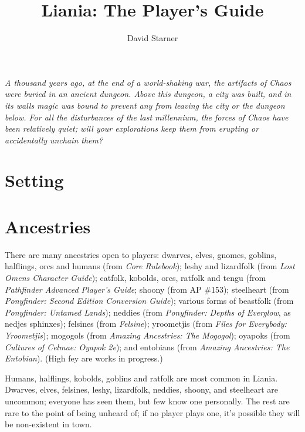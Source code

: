 \documentclass{report}
\title{Liania: The Player's Guide}
\author{David Starner}
\begin{document}
\maketitle
\emph{A thousand years ago, at the end of a world-shaking war, the artifacts of
Chaos were buried in an ancient dungeon. Above this dungeon, a city was built,
and in its walls magic was bound to prevent any from leaving the city or the
dungeon below. For all the disturbances of the last millennium, the forces
of Chaos have been relatively quiet; will your explorations keep them from
erupting or accidentally unchain them?}

\chapter{Setting}


\chapter{Ancestries}

There are many ancestries open to players: dwarves, elves, gnomes, goblins,
halflings, orcs and humans (from \emph{Core Rulebook}); leshy and lizard\-folk (from
\emph{Lost Omens Character Guide}); catfolk, kobolds, orcs, ratfolk and tengu (from
\emph{Pathfinder Advanced Player's Guide}; shoony (from AP \#153);
steel\-heart (from \emph{Pony\-finder: Second Edition Conversion Guide}); various forms
of beast\-folk (from \emph{Pony\-finder: Untamed Lands}); neddies (from \emph{Pony\-finder:
Depths of Everglow}, as nedjes sphinxes); felsines (from \emph{Felsine}); yroo\-metjis (from
\emph{Files for Everybody: Yroometjis}); mogogols (from
\emph{Amazing Ancestries: The Mogogol}); oya\-poks (from
\emph{Cultures of Celmae: Oyapok 2e}); and ento\-bians (from
\emph{Amazing Ancestries: The Entobian}). (High fey are works in
progress.)

Humans, halflings, kobolds, goblins and rat\-folk are most common in Liania.
Dwarves, elves, felsines, leshy, lizardfolk, neddies, shoony, and steelheart are
uncommon; everyone has seen them, but few know one personally. The rest are
rare to the point of being unheard of; if no player plays one, it's possible
they will be non-existent in town.
\end{document}
